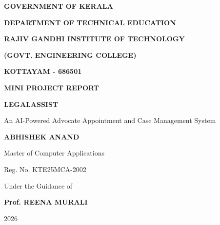 \documentclass[12pt,a4paper]{report}
\begin{document}

\begin{titlepage}

\centering

\textbf{\Large GOVERNMENT OF KERALA}

\vspace{0.4cm}

\textbf{\Large DEPARTMENT OF TECHNICAL EDUCATION}

\vspace{0.8cm}

\textbf{\Large RAJIV GANDHI INSTITUTE OF TECHNOLOGY}

\vspace{0.4cm}

\textbf{\Large (GOVT. ENGINEERING COLLEGE)}

\vspace{0.4cm}

\textbf{\Large KOTTAYAM - 686501}

\vspace{1.5cm}


\vspace{1.5cm}

{\Large\textbf{MINI PROJECT REPORT}}

\vspace{1cm}

{\LARGE\textbf{LEGALASSIST}}

\vspace{0.5cm}

{\large
An AI-Powered Advocate Appointment and Case Management System
}

\vfill

\textbf{ABHISHEK ANAND}

\vspace{0.3cm}

Master of Computer Applications

\vspace{0.3cm}

Reg. No. KTE25MCA-2002

\vspace{0.6cm}

Under the Guidance of

\vspace{0.2cm}

\textbf{Prof. REENA MURALI}

\vspace{0.8cm}

2026

\end{titlepage}
\end{document}
